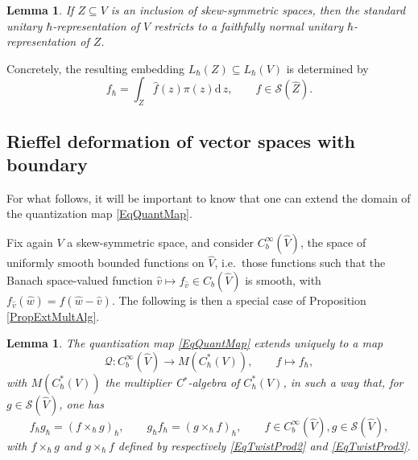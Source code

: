 \documentclass[11pt, reqno]{amsart}
\newtheorem{lemma}[theorem]{Lemma}
\theoremstyle{definition}
\numberwithin{equation}{section}
\def\Qc{\mathcal Q}
\def\Sc{\mathcal S}
\newcommand{\rd}{\mathrm{d}\!\,}
\begin{document}
\begin{lemma}\label{LemIncGivesFaith}
If $Z \subseteq V$ is an inclusion of skew-symmetric spaces, then the  standard unitary $\hbar$-representation of $V$ restricts to a faithfully normal unitary $\hbar$-representation of $Z$. 
\end{lemma}

Concretely, the resulting embedding $L_{\hbar}(Z) \subseteq L_{\hbar}(V)$ is determined by 
\[
f_{\hbar}  =  \int_{Z} \hat{f}(z) \pi(z) \rd z,\qquad f\in \Sc(\hat{Z}).
\]


\subsection{Rieffel deformation of vector spaces with boundary}

For what follows, it will be important to know that one can extend the domain of the quantization map \eqref{EqQuantMap}. 

Fix again $V$ a skew-symmetric space, and consider $C_b^{\infty}(\hat{V})$, the space of uniformly smooth bounded functions on $\hat{V}$, i.e.\ those functions such that the Banach space-valued function $\hat{v}\mapsto f_{\hat{v}} \in C_b(\hat{V})$ is smooth, with $f_{\hat{v}}(\hat{w}) = f(\hat{w}-\hat{v})$. The following is then a special case of Proposition \ref{PropExtMultAlg}.


\begin{lemma}
The quantization map \eqref{EqQuantMap} extends uniquely to a map 
\begin{equation}\label{EqQuantMapGen}
\Qc\colon  C_b^{\infty}(\hat{V}) \rightarrow M(C^*_{\hbar}(V)),\qquad f \mapsto f_{\hbar},
\end{equation}
with $M(C^*_{\hbar}(V))$ the multiplier C$^*$-algebra of $C^*_{\hbar}(V)$, in such a way that, for $g \in \Sc(\hat{V})$, one has 
\[
f_{\hbar}g_{\hbar} = (f\times_{\hbar} g)_{\hbar},\qquad g_{\hbar}f_{\hbar} = (g\times_{\hbar} f)_{\hbar},\qquad f \in C_b^{\infty}(\hat{V}),g\in \Sc(\hat{V}),
\]
with $f\times_{\hbar}g$ and $g\times_{\hbar}f$ defined by respectively \eqref{EqTwistProd2} and \eqref{EqTwistProd3}.
\end{lemma}
\end{document}
